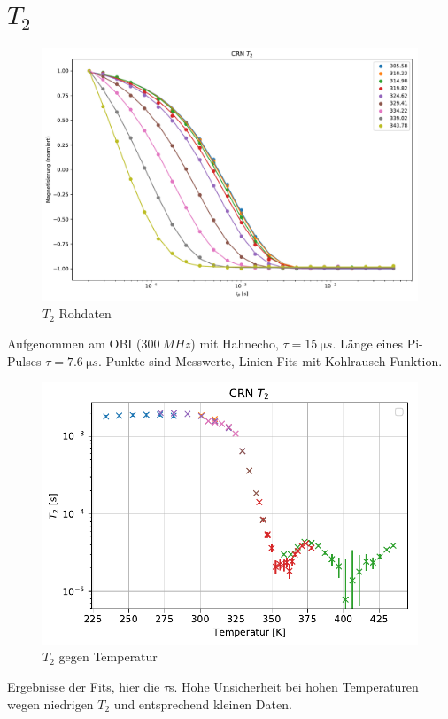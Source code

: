 \section{$T_2$} \label{section:res:T_2}

\begin{figure}
	\begin{center}
		\includegraphics[width=\textwidth]{graphics/plots/T2/t2_roh.pdf}
	\end{center}
	\caption{$T_2$ Rohdaten} \label{fig:res:T_2_roh}
\end{figure}
Aufgenommen am OBI ($\SI{300}{MHz}$) mit Hahnecho, $\tau = \SI{15}{\micro s}$. Länge eines Pi-Pulses $\tau = \SI{7.6}{\micro s}$. Punkte sind Messwerte, Linien Fits mit Kohlrausch-Funktion.

\begin{figure}
	\begin{center}
		\includegraphics[width=\textwidth]{graphics/plots/T2/t2.pdf}
	\end{center}
	\caption{$T_2$ gegen Temperatur} \label{fig:res:T_2}
\end{figure}
Ergebnisse der Fits, hier die $\tau$s. Hohe Unsicherheit bei hohen Temperaturen wegen niedrigen $T_2$ und entsprechend kleinen Daten.

